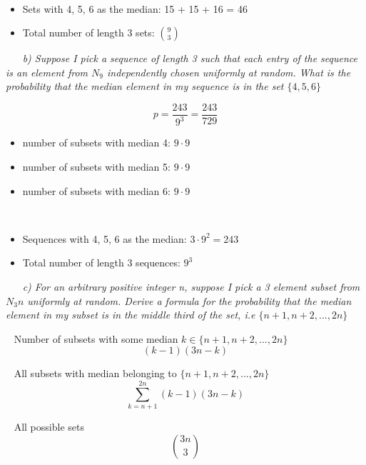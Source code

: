 \documentclass[12pt, letterpaper]{article}
\begin{document}
\-\ \newline
\begin{itemize}
    \item Sets with 4, 5, 6 as the median: 15 + 15 + 16 = 46
    \item Total number of length 3 sets: \({9 \choose 3}\)
\end{itemize} 

\-\ \newline
\-\ \it{ b) Suppose I pick a sequence of length 3 such that each entry of the sequence is an element from \(N_9\)
independently chosen uniformly at random. What is the probability that the median element in
my sequence is in the set \(\{4, 5, 6\}\)  }

\[ p = \frac{243}{9^{3}} = \frac{243}{729} \]

\begin{itemize}
    \item number of subsets with median 4: \(9\cdot9\)
    \item number of subsets with median 5: \(9\cdot9\)
    \item number of subsets with median 6: \(9\cdot9\)
\end{itemize} 

\-\ \newline
\begin{itemize}
    \item Sequences with 4, 5, 6 as the median: \(3 \cdot 9^{2} = 243\)
    \item Total number of length 3 sequences: \(9 ^{3}\)
\end{itemize} 


\-\ \newline
\-\ \it{ c) For an arbitrary positive integer n, suppose I pick a 3 element subset from \(N_3n\) uniformly at
random. Derive a formula for the probability that the median element in my subset is in the
middle third of the set, i.e \(\{n + 1, n + 2, ..., 2n\}\)  }

\-\ \newline
\textnormal{ Number of subsets with some median \(k \in \{n + 1, n + 2, ..., 2n\}\) }
\[ (k - 1)(3n - k) \]

\-\ \newline
\textnormal{All subsets with median belonging to \(\{n + 1, n + 2, ..., 2n\}\)}
\[ \sum_{k=n+1}^{2n} (k - 1)(3n - k)\]

\-\ \newline
\textnormal{All possible sets}
\[ {3n \choose 3} \]
\end{document}
